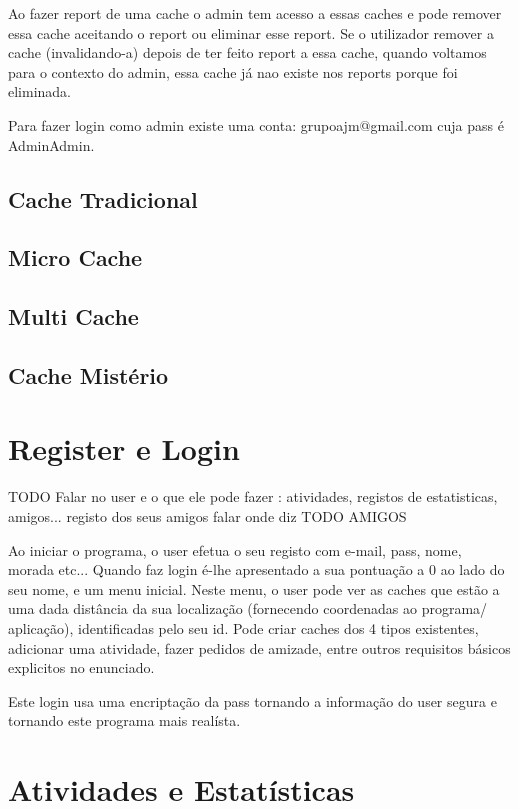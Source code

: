 \documentclass{article}
\begin{document}
Ao fazer report de uma cache o admin tem acesso a essas caches e pode remover essa cache aceitando o report ou eliminar esse report. Se o utilizador remover a cache (invalidando-a) depois de ter feito report a essa cache, quando voltamos para o contexto do admin, essa cache já nao existe nos reports porque foi eliminada.

Para fazer login como admin existe uma conta: grupoajm@gmail.com   cuja pass é AdminAdmin.


\subsection{ Cache Tradicional}
\subsection{ Micro Cache }
\subsection{ Multi Cache}
\subsection{ Cache Mistério }



\pagebreak
\section{Register e Login}
TODO
Falar no user e o que ele pode fazer : atividades, registos de estatisticas, amigos...
registo dos seus amigos falar onde diz TODO AMIGOS

Ao iniciar o programa, o user efetua o seu registo com e-mail, pass, nome, morada etc... Quando faz login é-lhe apresentado a sua pontuação a 0 ao lado do seu nome, e um menu inicial.
Neste menu, o user pode ver as caches que estão a uma dada distância da sua localização (fornecendo coordenadas ao programa/ aplicação), identificadas pelo seu id. Pode criar caches dos 4 tipos existentes, adicionar uma atividade, fazer pedidos de amizade, entre outros requisitos básicos explicitos no enunciado.

Este login usa uma encriptação da pass tornando a informação do user segura e tornando este programa mais realísta.








\pagebreak
\section{Atividades e Estatísticas}
\end{document}
